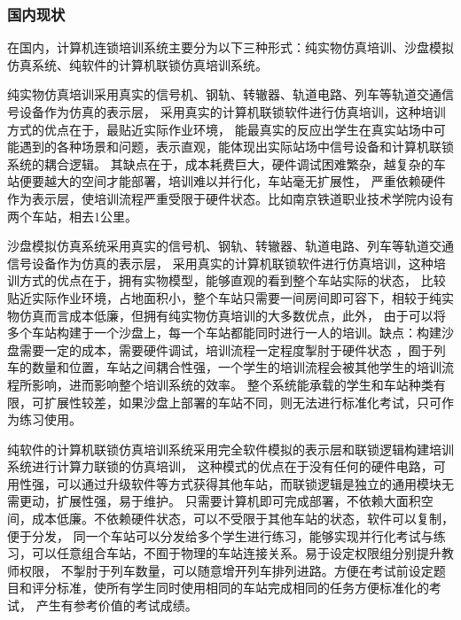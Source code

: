 \subsubsection{国内现状}

在国内，计算机连锁培训系统主要分为以下三种形式：纯实物仿真培训、沙盘模拟仿真系统、纯软件的计算机联锁仿真培训系统。

纯实物仿真培训采用真实的信号机、钢轨、转辙器、轨道电路、列车等轨道交通信号设备作为仿真的表示层，
采用真实的计算机联锁软件进行仿真培训，这种培训方式的优点在于，最贴近实际作业环境，
能最真实的反应出学生在真实站场中可能遇到的各种场景和问题，表示直观，能体现出实际站场中信号设备和计算机联锁系统的耦合逻辑。
其缺点在于，成本耗费巨大，硬件调试困难繁杂，越复杂的车站便要越大的空间才能部署，培训难以并行化，车站毫无扩展性，
严重依赖硬件作为表示层，使培训流程严重受限于硬件状态。比如南京铁道职业技术学院内设有两个车站，相去1公里。

沙盘模拟仿真系统采用真实的信号机、钢轨、转辙器、轨道电路、列车等轨道交通信号设备作为仿真的表示层，
采用真实的计算机联锁软件进行仿真培训，这种培训方式的优点在于，拥有实物模型，能够直观的看到整个车站实际的状态，
比较贴近实际作业环境，占地面积小，整个车站只需要一间房间即可容下，相较于纯实物仿真而言成本低廉，但拥有纯实物仿真培训的大多数优点，此外，
由于可以将多个车站构建于一个沙盘上，每一个车站都能同时进行一人的培训。缺点：构建沙盘需要一定的成本，需要硬件调试，培训流程一定程度掣肘于硬件状态
，囿于列车的数量和位置，车站之间耦合性强，一个学生的培训流程会被其他学生的培训流程所影响，进而影响整个培训系统的效率。
整个系统能承载的学生和车站种类有限，可扩展性较差，如果沙盘上部署的车站不同，则无法进行标准化考试，只可作为练习使用。

纯软件的计算机联锁仿真培训系统采用完全软件模拟的表示层和联锁逻辑构建培训系统进行计算力联锁的仿真培训，
这种模式的优点在于没有任何的硬件电路，可用性强，可以通过升级软件等方式获得其他车站，而联锁逻辑是独立的通用模块无需更动，扩展性强，易于维护。
只需要计算机即可完成部署，不依赖大面积空间，成本低廉。不依赖硬件状态，可以不受限于其他车站的状态，软件可以复制，便于分发，
同一个车站可以分发给多个学生进行练习，能够实现并行化考试与练习，可以任意组合车站，不囿于物理的车站连接关系。易于设定权限组分别提升教师权限，
不掣肘于列车数量，可以随意增开列车排列进路。方便在考试前设定题目和评分标准，使所有学生同时使用相同的车站完成相同的任务方便标准化的考试，
产生有参考价值的考试成绩。
